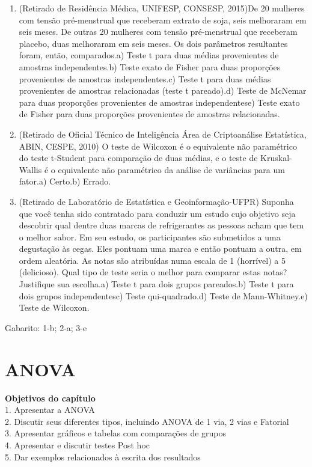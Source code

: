 \documentclass[
]{book}
\newenvironment{objectives}{
  \definecolor{shadecolor}{rgb}{0.764,0.992,0.686}  %
  \color{black}
  \begin{shaded}}
 {\end{shaded}}
\begin{document}
\begin{enumerate}
\def\labelenumi{\arabic{enumi}.}
\item
  (Retirado de Residência Médica, UNIFESP, CONSESP, 2015)De 20 mulheres com tensão pré-menstrual que receberam extrato de soja, seis melhoraram em seis meses. De outras 20 mulheres com tensão pré-menstrual que receberam placebo, duas melhoraram em seis meses. Os dois parâmetros resultantes foram, então, comparados.a) Teste t para duas médias provenientes de amostras independentes.b) Teste exato de Fisher para duas proporções provenientes de amostras independentes.c) Teste t para duas médias provenientes de amostras relacionadas (teste t pareado).d) Teste de McNemar para duas proporções provenientes de amostras independentese) Teste exato de Fisher para duas proporções provenientes de amostras relacionadas.
\item
  (Retirado de Oficial Técnico de Inteligência Área de Criptoanálise Estatística, ABIN, CESPE, 2010) O teste de Wilcoxon é o equivalente não paramétrico do teste t-Student para comparação de duas médias, e o teste de Kruskal-Wallis é o equivalente não paramétrico da análise de variâncias para um fator.a) Certo.b) Errado.
\item
  (Retirado de Laboratório de Estatística e Geoinformação-UFPR) Suponha que você tenha sido contratado para conduzir um estudo cujo objetivo seja descobrir qual dentre duas marcas de refrigerantes as pessoas acham que tem o melhor sabor. Em seu estudo, os participantes são submetidos a uma degustação às cegas. Eles pontuam uma marca e então pontuam a outra, em ordem aleatória. As notas são atribuídas numa escala de 1 (horrível) a 5 (delicioso). Qual tipo de teste seria o melhor para comparar estas notas? Justifique sua escolha.a) Teste t para dois grupos pareados.b) Teste t para dois grupos independentesc) Teste qui-quadrado.d) Teste de Mann-Whitney.e) Teste de Wilcoxon.
\end{enumerate}

Gabarito: 1-b; 2-a; 3-e

\hypertarget{anova}{%
\chapter{ANOVA}\label{anova}}

\begin{objectives}
\textbf{Objetivos do capítulo}\\
1. Apresentar a ANOVA\\
2. Discutir seus diferentes tipos, incluindo ANOVA de 1 via, 2 vias e Fatorial\\
3. Apresentar gráficos e tabelas com comparações de grupos\\
4. Apresentar e discutir testes Post hoc\\
5. Dar exemplos relacionados à escrita dos resultados

\end{objectives}
\end{document}
